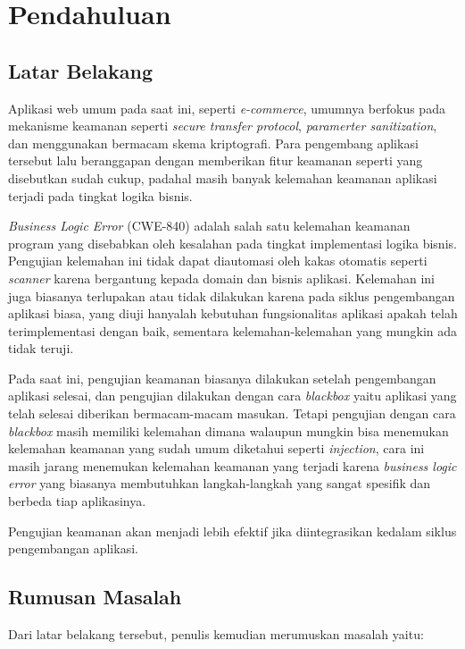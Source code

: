 \chapter{Pendahuluan}

\section{Latar Belakang}

Aplikasi web umum pada saat ini, seperti \textit{e-commerce}, umumnya berfokus pada mekanisme keamanan
seperti \textit{secure transfer protocol}, \textit{paramerter sanitization}, dan menggunakan bermacam skema
kriptografi. Para pengembang aplikasi tersebut lalu beranggapan dengan memberikan fitur keamanan seperti yang
disebutkan sudah cukup, padahal masih banyak kelemahan keamanan aplikasi terjadi pada
tingkat logika bisnis.

\textit{Business Logic Error} (CWE-840) adalah salah satu kelemahan keamanan program yang disebabkan oleh kesalahan pada
tingkat implementasi logika bisnis.
Pengujian kelemahan ini tidak dapat diautomasi oleh kakas otomatis seperti \textit{scanner}
karena bergantung kepada domain dan bisnis aplikasi.
Kelemahan ini juga biasanya terlupakan atau tidak dilakukan karena pada siklus pengembangan aplikasi biasa,
yang diuji hanyalah kebutuhan fungsionalitas aplikasi apakah telah
terimplementasi dengan baik, sementara kelemahan-kelemahan yang mungkin ada tidak teruji.

Pada saat ini, pengujian keamanan biasanya dilakukan setelah pengembangan aplikasi selesai, dan pengujian
dilakukan dengan cara \textit{blackbox} yaitu aplikasi yang telah selesai diberikan bermacam-macam masukan.
Tetapi pengujian dengan cara \textit{blackbox} masih memiliki kelemahan dimana walaupun mungkin bisa menemukan
kelemahan keamanan yang sudah umum diketahui seperti \textit{injection}, cara ini masih jarang menemukan
kelemahan keamanan yang terjadi karena \textit{business logic error} yang biasanya membutuhkan
langkah-langkah yang sangat spesifik dan berbeda tiap aplikasinya.

Pengujian keamanan akan menjadi lebih efektif jika diintegrasikan kedalam siklus pengembangan aplikasi.

\section{Rumusan Masalah}

Dari latar belakang tersebut, penulis kemudian merumuskan masalah yaitu:

